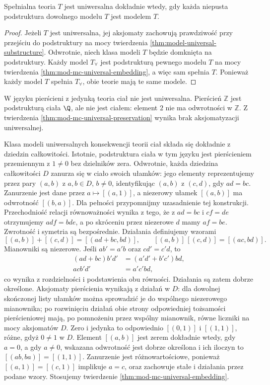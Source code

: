 \begin{twierdzenie}
\label{thm:mod-mc-universal-preservation}
Spełnialna teoria $T$ jest uniwersalna dokładnie wtedy,
gdy każda niepusta podstruktura dowolnego modelu $T$
jest modelem $T$.
\end{twierdzenie}
\begin{proof}
Jeżeli $T$ jest uniwersalna, jej aksjomaty zachowują
prawdziwość przy przejściu do podstruktury na mocy
twierdzenia \ref{thm:model-universal-substructure}.
Odwrotnie, niech klasa modeli $T$ będzie domknięta
na podstruktury. Każdy model $T_{\forall}$ jest
podstrukturą pewnego modelu $T$ na mocy twierdzenia
\ref{thm:mod-mc-universal-embedding}, a więc
sam spełnia $T$. Ponieważ każdy model $T$ spełnia
$T_{\forall}$, obie teorie mają te same modele.
\end{proof}

\begin{przyklad}
\label{ex:mod-mc-fields-universal}
W języku pierścieni z jedynką teoria ciał nie jest
uniwersalna. Pierścień $\mathbb Z$ jest podstrukturą
ciała $\Q$, ale nie jest ciałem: element $2$ nie ma
odwrotności w $\mathbb Z$. Z twierdzenia
\ref{thm:mod-mc-universal-preservation} wynika brak
aksjomatyzacji uniwersalnej.

Klasa modeli uniwersalnych konsekwencji teorii ciał
składa się dokładnie z dziedzin całkowitości.
Istotnie, podstruktura ciała w tym języku jest
pierścieniem przemiennym z $1\ne0$ bez dzielników
zera. Odwrotnie, każda dziedzina całkowitości $D$
zanurza się w ciało swoich ułamków: jego elementy
reprezentujemy przez pary $(a,b)$ z $a,b\in D$, $b\ne0$,
identyfikując $(a,b)$ z $(c,d)$, gdy $ad=bc$.
Zanurzenie jest dane przez $a\mapsto[(a,1)]$,
a niezerowy ułamek $[(a,b)]$ ma odwrotność $[(b,a)]$.
Dla pełności przypomnijmy uzasadnienie tej konstrukcji.
Przechodniość relacji równoważności wynika z tego,
że z $ad=bc$ i $cf=de$ otrzymujemy $adf=bde$,
a po skróceniu przez niezerowe $d$ mamy $af=be$.
Zwrotność i symetria są bezpośrednie.
Działania definiujemy wzorami
\[
[(a,b)]+[(c,d)]=[(ad+bc,bd)],
\qquad
[(a,b)]\,[(c,d)]=[(ac,bd)].
\]
Mianowniki są niezerowe. Jeśli $ab'=a'b$ oraz
$cd'=c'd$, to
\[
\begin{aligned}
(ad+bc)b'd'&=(a'd'+b'c')bd,\\
acb'd'&=a'c'bd,
\end{aligned}
\]
co wynika z rozdzielności i podstawienia obu równości.
Działania są zatem dobrze określone.
Aksjomaty pierścienia wynikają z działań w $D$:
dla dowolnej skończonej listy ułamków można
sprowadzić je do wspólnego niezerowego mianownika;
po rozwinięciu działań obie strony odpowiedniej
tożsamości pierścieniowej mają, po pomnożeniu
przez wspólny mianownik, równe liczniki na mocy
aksjomatów $D$. Zero i jedynka to odpowiednio
$[(0,1)]$ i $[(1,1)]$, różne, gdyż $0\ne1$ w $D$.
Element $[(a,b)]$ jest zerem dokładnie wtedy,
gdy $a=0$, a gdy $a\ne0$, wskazana odwrotność
jest dobrze określona i ich iloczyn to
$[(ab,ba)]=[(1,1)]$.
Zanurzenie jest różnowartościowe, ponieważ
$[(a,1)]=[(c,1)]$ implikuje $a=c$,
oraz zachowuje stałe i działania przez podane wzory.
Stosujemy twierdzenie \ref{thm:mod-mc-universal-embedding}.
\end{przyklad}

